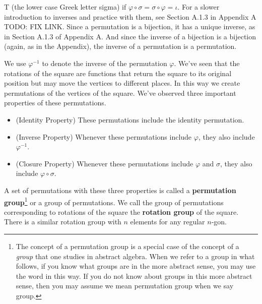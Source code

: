 \documentclass[10pt,]{book}
\newcommand{\terminology}[1]{\textbf{#1}}
\theoremstyle{plain}
\theoremstyle{definition}
\theoremstyle{definition}
\numberwithin{equation}{chapter}
\begin{document}
\rightarrow T\) (the lower case Greek letter sigma) if \(\varphi\circ \sigma= \sigma
\circ\varphi =
\iota\). For a slower introduction to inverses and practice with them, see Section A.1.3 in Appendix A TODO: FIX LINK.  Since a permutation is a bijection, it has a unique inverse, as in Section A.1.3 of Appendix A.  And since the inverse of a bijection is a bijection (again, as in the Appendix), the inverse of a permutation is a permutation.%
\par
We use \(\varphi^{-1}\) to denote the inverse of the permutation \(\varphi\). We've seen that the rotations of the square are functions that return the square to its original position but may move the vertices to different places. In this way we create permutations of the vertices of the square. We've observed three important properties of these permutations. \leavevmode%
\begin{itemize}[label=\textbullet]
\item{}(Identity Property) These permutations include the identity permutation.%
\item{}(Inverse Property) Whenever these permutations include \(\varphi\), they also include \(\varphi^{-1}\).%
\item{}(Closure Property)  Whenever these permutations include \(\varphi\) and \(\sigma\), they also include \(\varphi\circ\sigma\).%
\end{itemize}
%
\par
A set of permutations with these three properties is called a \terminology{permutation group}\footnote{The concept of a permutation group is a special case of the concept of a \emph{group} that one studies in abstract algebra.  When we refer to a group in what follows, if you  know what groups are in the more abstract sense, you may use the word in this way. If you do not know about groups in this more abstract sense, then you may assume we mean permutation group when we say group.\label{fn-20}} or a group of permutations. We call the group of permutations corresponding to rotations of the square the \terminology{rotation group} of the square. There is a similar rotation group with \(n\) elements for any regular \(n\)-gon.%
\end{document}
